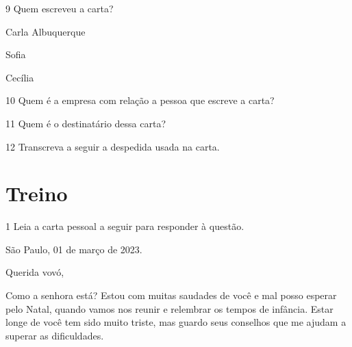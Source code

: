 \begin{conteudo}
\begin{conteudo}

\num{9} Quem escreveu a carta?

\begin{boxlist}
 Carla Albuquerque  

 Sofia

 Cecília
\end{boxlist}

\num{10} Quem é a empresa com relação a pessoa que escreve a carta?

\num{11} Quem é o destinatário dessa carta?

\num{12} Transcreva a seguir a despedida usada na carta. 

\pagebreak
\section*{Treino}

\num{1} Leia a carta pessoal a seguir para responder à questão.


\begin{mdframed}[linewidth=10pt,linecolor=salmao!20,backgroundcolor=salmao!20,roundcorner=20pt]
\begin{flushright}
São Paulo, 01 de março de 2023.
\end{flushright}

Querida vovó,

Como a senhora está? Estou com muitas saudades de você e mal posso
esperar pelo Natal, quando vamos nos reunir e relembrar os tempos de
infância. Estar longe de você tem sido muito triste, mas guardo seus
conselhos que me ajudam a superar as dificuldades.


\end{mdframed}
\end{conteudo}
\end{conteudo}
